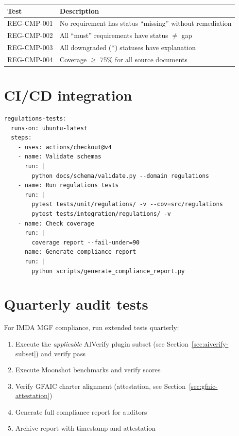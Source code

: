 \begin{tabularx}{\linewidth}{@{}l X@{}}
\toprule
\textbf{Test} & \textbf{Description} \\ \midrule
REG-CMP-001 & No requirement has status ``missing'' without remediation \\
REG-CMP-002 & All ``must'' requirements have status $\neq$ gap \\
REG-CMP-003 & All downgraded (*) statuses have explanation \\
REG-CMP-004 & Coverage $\geq$ 75\% for all source documents \\
\bottomrule
\end{tabularx}

\section{CI/CD integration}

\begin{lstlisting}[basicstyle=\ttfamily\small,caption={GitHub Actions workflow excerpt.}]
regulations-tests:
  runs-on: ubuntu-latest
  steps:
    - uses: actions/checkout@v4
    - name: Validate schemas
      run: |
        python docs/schema/validate.py --domain regulations
    - name: Run regulations tests
      run: |
        pytest tests/unit/regulations/ -v --cov=src/regulations
        pytest tests/integration/regulations/ -v
    - name: Check coverage
      run: |
        coverage report --fail-under=90
    - name: Generate compliance report
      run: |
        python scripts/generate_compliance_report.py
\end{lstlisting}

\section{Quarterly audit tests}\label{sec:quarterly-audit}

For IMDA MGF compliance, run extended tests quarterly:

\begin{enumerate}
  \item Execute the \emph{applicable} AIVerify plugin subset
        (see Section~\ref{sec:aiverify-subset}) and verify pass
  \item Execute Moonshot benchmarks and verify scores
  \item Verify GFAIC charter alignment (attestation, see
        Section~\ref{sec:gfaic-attestation})
  \item Generate full compliance report for auditors
  \item Archive report with timestamp and attestation
\end{enumerate}

